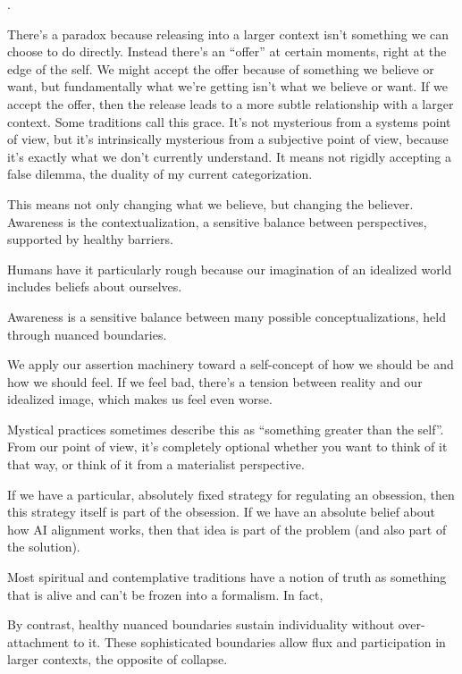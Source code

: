 \citep{yontef1993awareness}. 

There's a paradox because releasing into a larger context isn't something we can choose to do directly. Instead there's an “offer” at certain moments, right at the edge of the self. We might accept the offer because of something we believe or want, but fundamentally what we're getting isn't what we believe or want. If we accept the offer, then the release leads to a more subtle relationship with a larger context. Some traditions call this grace. It's not mysterious from a systems point of view, but it's intrinsically mysterious from a subjective point of view, because it's exactly what we don't currently understand. It means not rigidly accepting a false dilemma, the duality of my current categorization.

This means not only changing what we believe, but changing the believer. Awareness is the contextualization, a sensitive balance between perspectives, supported by healthy barriers. 

Humans have it particularly rough because our imagination of an idealized world includes beliefs about ourselves. 

Awareness is a sensitive balance between many possible conceptualizations, held through nuanced boundaries.

We apply our assertion machinery toward a self-concept of how we should be and how we should feel. If we feel bad, there's a tension between reality and our idealized image, which makes us feel even worse. 

Mystical practices sometimes describe this as ``something greater than the self''. From our point of view, it's completely optional whether you want to think of it that way, or think of it from a materialist perspective.

If we have a particular, absolutely fixed strategy for regulating an obsession, then this strategy itself is part of the obsession. If we have an absolute belief about how AI alignment works, then that idea is part of the problem (and also part of the solution). 



Most spiritual and contemplative traditions have a notion of truth as something that is alive and can't be frozen into a formalism. In fact, 




By contrast, healthy nuanced boundaries sustain individuality without over-attachment to it. These sophisticated boundaries allow flux and participation in larger contexts, the opposite of collapse. 

